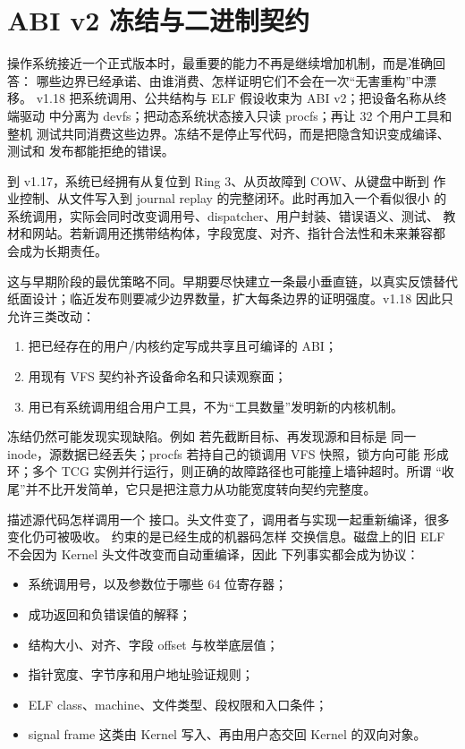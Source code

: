 \section{ABI v2 冻结与二进制契约}

\begin{keyidea}
操作系统接近一个正式版本时，最重要的能力不再是继续增加机制，而是准确回答：
哪些边界已经承诺、由谁消费、怎样证明它们不会在一次“无害重构”中漂移。
v1.18 把系统调用、公共结构与 ELF 假设收束为 ABI v2；把设备名称从终端驱动
中分离为 devfs；把动态系统状态接入只读 procfs；再让 32 个用户工具和整机
测试共同消费这些边界。冻结不是停止写代码，而是把隐含知识变成编译、测试和
发布都能拒绝的错误。
\end{keyidea}

到 v1.17，系统已经拥有从复位到 Ring 3、从页故障到 COW、从键盘中断到
作业控制、从文件写入到 journal replay 的完整闭环。此时再加入一个看似很小
的系统调用，实际会同时改变调用号、dispatcher、用户封装、错误语义、测试、
教材和网站。若新调用还携带结构体，字段宽度、对齐、指针合法性和未来兼容都
会成为长期责任。

这与早期阶段的最优策略不同。早期要尽快建立一条最小垂直链，以真实反馈替代
纸面设计；临近发布则要减少边界数量，扩大每条边界的证明强度。v1.18 因此只
允许三类改动：

\begin{enumerate}[leftmargin=2.1em]
  \item 把已经存在的用户/内核约定写成共享且可编译的 ABI；
  \item 用现有 VFS 契约补齐设备命名和只读观察面；
  \item 用已有系统调用组合用户工具，不为“工具数量”发明新的内核机制。
\end{enumerate}

冻结仍然可能发现实现缺陷。例如  若先截断目标、再发现源和目标是
同一 inode，源数据已经丢失；procfs 若持自己的锁调用 VFS 快照，锁方向可能
形成环；多个 TCG 实例并行运行，则正确的故障路径也可能撞上墙钟超时。所谓
“收尾”并不比开发简单，它只是把注意力从功能宽度转向契约完整度。

描述源代码怎样调用一个
接口。头文件变了，调用者与实现一起重新编译，很多变化仍可被吸收。
约束的是已经生成的机器码怎样
交换信息。磁盘上的旧 ELF 不会因为 Kernel 头文件改变而自动重编译，因此
下列事实都会成为协议：

\begin{itemize}[leftmargin=2em]
  \item 系统调用号，以及参数位于哪些 64 位寄存器；
  \item 成功返回和负错误值的解释；
  \item 结构大小、对齐、字段 offset 与枚举底层值；
  \item 指针宽度、字节序和用户地址验证规则；
  \item ELF class、machine、文件类型、段权限和入口条件；
  \item signal frame 这类由 Kernel 写入、再由用户态交回 Kernel 的双向对象。
\end{itemize}


